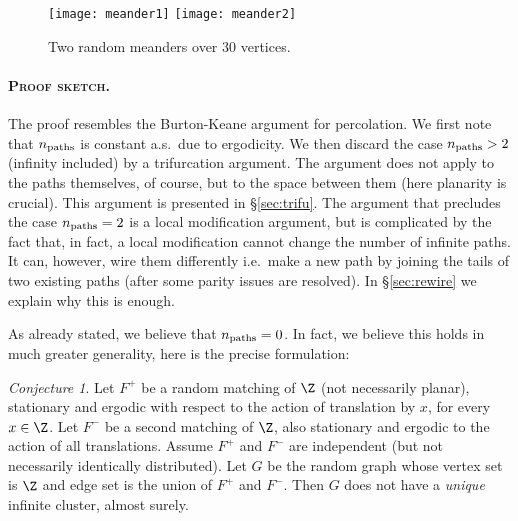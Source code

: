 \documentclass[12pt]{amsart}
\edef\sectionsign{\S}
\newcommand{\npath}{n_{\rm paths}}
\theoremstyle{remark}
\newtheorem*{conjecture*}{Conjecture}
\begin{document}
\begin{figure}[!h]
 \begin{center}
 \texttt{[image: meander1]} \hspace{2cm}
  \texttt{[image: meander2]}
 \caption{Two random meanders over $30$ vertices.}
 \end{center}
 \end{figure}

\paragraph{\textsc{Proof sketch}.}The proof resembles the Burton-Keane argument for percolation. We first note that $\npath$ is constant a.s.\ due to ergodicity. We then discard the case $\npath > 2$ (infinity included) by a trifurcation argument. The argument does not apply to the paths themselves, of course, but to the space between them (here planarity is crucial). This argument is presented in \sectionsign \ref{sec:trifu}. The argument that precludes the case $\npath=2$ is a local modification argument, but is complicated by the fact that, in fact, a local modification cannot change the number of infinite paths. It can, however, wire them differently i.e.\ make a new path by joining the tails of two existing paths (after some parity issues are resolved). In \sectionsign\ref{sec:rewire} we explain why this is enough.

\medskip
\noindent As already stated, we believe that $\npath=0$. In fact, we believe this holds in much greater generality, here is the precise formulation:
\begin{conjecture*}Let $F^+$ be a random matching of $\Z$ (not necessarily planar), stationary and ergodic with respect to the action of translation by $x$, for every $x\in\Z$. Let $F^-$ be a second matching of $\Z$, also stationary and ergodic to the action of all translations. Assume $F^+$ and $F^-$ are independent (but not necessarily identically distributed). Let $G$ be the random graph whose vertex set is $\Z$ and edge set is the union of $F^+$ and $F^-$. Then $G$ does not have a \emph{unique} infinite cluster, almost surely.
\end{conjecture*}
\end{document}
